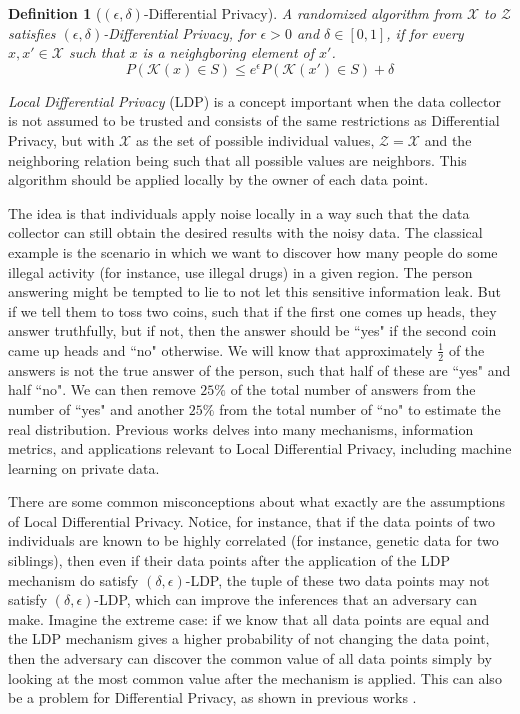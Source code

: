 \documentclass[conference]{IEEEtran}
\newtheorem{definition}{Definition}
\newcommand{\qm}[1]{``#1"}
\begin{document}
\begin{definition}[$(\epsilon,\delta)$-Differential Privacy]\label{def:edLDP} A randomized algorithm from $\mathcal{X}$ to $\mathcal{Z}$ satisfies $(\epsilon,\delta)$-Differential Privacy, for $\epsilon > 0$ and $\delta \in [0,1]$, if for every $x,x' \in \mathcal{X}$ such that $x$ is a neighgboring element of $x'$.
$$P(\mathcal{K}(x) \in S) \leq e^\epsilon P(\mathcal{K}(x')\in S)+\delta$$
\end{definition}

\emph{Local Differential Privacy} (LDP) is a concept important when the data collector is not assumed to be trusted and consists of the same restrictions as Differential Privacy, but with $\mathcal{X}$ as the set of possible individual values, $\mathcal{Z}=\mathcal{X}$ and the neighboring relation being such that all possible values are neighbors. This algorithm should be applied locally by the owner of each data point.

The idea is that individuals apply noise locally in a way such that the data collector can still obtain the desired results with the noisy data. The classical example is the scenario in which we want to discover how many people do some illegal activity (for instance, use illegal drugs) in a given region. The person answering might be tempted to lie to not let this sensitive information leak. But if we tell them to toss two coins, such that if the first one comes up heads, they answer truthfully, but if not, then the answer should be \qm{yes} if the second coin came up heads and \qm{no} otherwise. We will know that approximately $\frac{1}{2}$ of the answers is not the true answer of the person, such that half of these are \qm{yes} and half \qm{no}. We can then remove $25\%$ of the total number of answers from the number of \qm{yes} and another $25\%$ from the total number of \qm{no} to estimate the real distribution. Previous works \cite{xiong2020comprehensive} delves into many mechanisms, information metrics, and applications relevant to Local Differential Privacy, including machine learning on private data.

There are some common misconceptions about what exactly are the assumptions of Local Differential Privacy. Notice, for instance, that if the data points of two individuals are known to be highly correlated (for instance, genetic data for two siblings), then even if their data points after the application of the LDP mechanism do satisfy $(\delta,\epsilon)$-LDP, the tuple of these two data points may not satisfy $(\delta,\epsilon)$-LDP, which can improve the inferences that an adversary can make. Imagine the extreme case: if we know that all data points are equal and the LDP mechanism gives a higher probability of not changing the data point, then the adversary can discover the common value of all data points simply by looking at the most common value after the mechanism is applied. This can also be a problem for Differential Privacy, as shown in previous works \cite{liu2016dependence}. 
\end{document}
